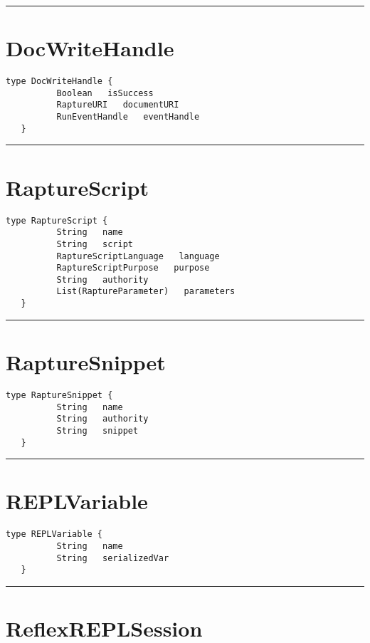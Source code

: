 \rule{12cm}{2pt}
\section{DocWriteHandle}
\label{type:DocWriteHandle}

\begin{lstlisting}[style=nonumbers]
   type DocWriteHandle {
          Boolean   isSuccess
          RaptureURI   documentURI
          RunEventHandle   eventHandle
   }
\end{lstlisting}

\rule{12cm}{2pt}
\section{RaptureScript}
\label{type:RaptureScript}

\begin{lstlisting}[style=nonumbers]
   type RaptureScript {
          String   name
          String   script
          RaptureScriptLanguage   language
          RaptureScriptPurpose   purpose
          String   authority
          List(RaptureParameter)   parameters
   }
\end{lstlisting}

\rule{12cm}{2pt}
\section{RaptureSnippet}
\label{type:RaptureSnippet}

\begin{lstlisting}[style=nonumbers]
   type RaptureSnippet {
          String   name
          String   authority
          String   snippet
   }
\end{lstlisting}

\rule{12cm}{2pt}
\section{REPLVariable}
\label{type:REPLVariable}

\begin{lstlisting}[style=nonumbers]
   type REPLVariable {
          String   name
          String   serializedVar
   }
\end{lstlisting}

\rule{12cm}{2pt}
\section{ReflexREPLSession}
\label{type:ReflexREPLSession}

